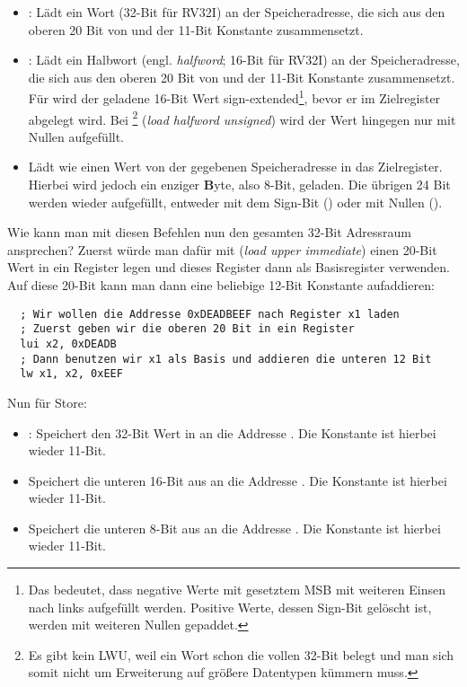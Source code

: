 \begin{itemize}
  \item {}: Lädt ein Wort (32-Bit für RV32I) an der
    Speicheradresse, die sich aus den oberen 20 Bit von  und der
    11-Bit Konstante  zusammensetzt.
  \item {}: Lädt ein Halbwort
    (engl. \emph{halfword}; 16-Bit für RV32I) an der Speicheradresse, die sich
    aus den oberen 20 Bit von  und der 11-Bit Konstante
     zusammensetzt. Für  wird der geladene 16-Bit Wert
    sign-extended\footnote{Das bedeutet, dass negative Werte mit gesetztem MSB
      mit weiteren Einsen nach links aufgefüllt werden. Positive Werte, dessen
      Sign-Bit gelöscht ist, werden mit weiteren Nullen gepaddet.}, bevor er im
    Zielregister abgelegt wird. Bei \footnote{Es gibt kein LWU, weil
      ein Wort schon die vollen 32-Bit belegt und man sich somit nicht um
      Erweiterung auf größere Datentypen kümmern muss.} (\emph{load halfword
      unsigned}) wird der Wert hingegen nur mit Nullen aufgefüllt.
  \item {} Lädt wie  einen Wert von
    der gegebenen Speicheradresse in das Zielregister. Hierbei wird jedoch ein
    enziger \textbf{B}yte, also 8-Bit, geladen. Die übrigen 24 Bit werden wieder
    aufgefüllt, entweder mit dem Sign-Bit () oder mit Nullen
    ().
\end{itemize}

Wie kann man mit diesen Befehlen nun den gesamten 32-Bit Adressraum ansprechen?
Zuerst würde man dafür mit  (\emph{load upper immediate}) einen 20-Bit
Wert in ein Register legen und dieses Register dann als Basisregister
verwenden. Auf diese 20-Bit kann man dann eine beliebige 12-Bit Konstante
aufaddieren:

\begin{lstlisting}
  ; Wir wollen die Addresse 0xDEADBEEF nach Register x1 laden
  ; Zuerst geben wir die oberen 20 Bit in ein Register
  lui x2, 0xDEADB
  ; Dann benutzen wir x1 als Basis und addieren die unteren 12 Bit
  lw x1, x2, 0xEEF
\end{lstlisting}

Nun für Store:

\begin{itemize}
  \item {}: Speichert den 32-Bit Wert in 
    an die Addresse . Die Konstante  ist
    hierbei wieder 11-Bit.
  \item {} Speichert die unteren 16-Bit aus  an die Addresse
    . Die Konstante  ist hierbei wieder
    11-Bit.
  \item {} Speichert die unteren 8-Bit aus  an die Addresse
    . Die Konstante  ist hierbei wieder
    11-Bit.
\end{itemize}


